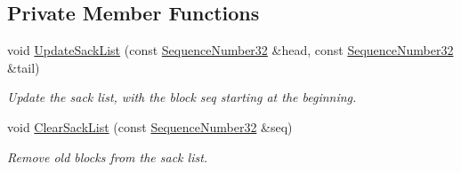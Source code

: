 \subsection*{Private Member Functions}
\begin{DoxyCompactItemize}
\item 
void \hyperlink{classns3_1_1TcpRxBuffer_abd2afbae9205cd763f48a458d001d2d5}{Update\+Sack\+List} (const \hyperlink{group__network_gacb2070e4e98d2d5135c9bede58f07a03}{Sequence\+Number32} \&head, const \hyperlink{group__network_gacb2070e4e98d2d5135c9bede58f07a03}{Sequence\+Number32} \&tail)
\begin{DoxyCompactList}\small\item\em Update the sack list, with the block seq starting at the beginning. \end{DoxyCompactList}\item 
void \hyperlink{classns3_1_1TcpRxBuffer_ad80e59250353c41c8866f6f02b82801c}{Clear\+Sack\+List} (const \hyperlink{group__network_gacb2070e4e98d2d5135c9bede58f07a03}{Sequence\+Number32} \&seq)
\begin{DoxyCompactList}\small\item\em Remove old blocks from the sack list. \end{DoxyCompactList}\end{DoxyCompactItemize}
